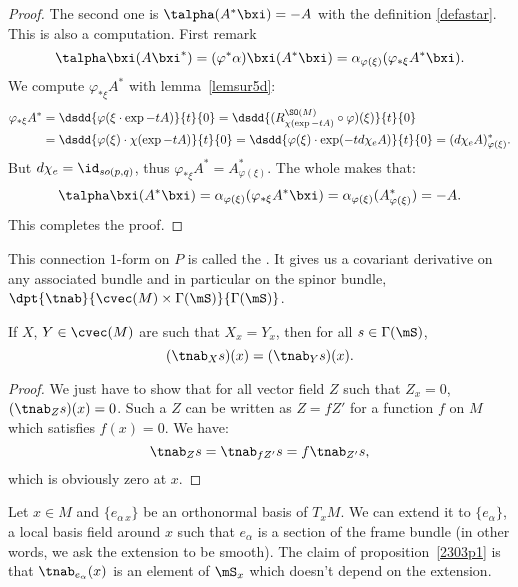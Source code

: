 \begin{proof}
	The second one is $\talpha(A^*\bxi)=-A$ with the definition \eqref{defastar}. This is also a computation. First remark
	\[
		\talpha\bxi(A\bxi^*)=(\varphi^*\alpha)\bxi(A^*\bxi)=\alpha_{\varphi(\xi)}(\varphi_{*\xi}A^*\bxi).
	\]
	We compute $\varphi_{*\xi}A^*$ with lemma~\ref{lemsur5d}:
	\begin{equation}
		\begin{split}
			\varphi_{*\xi}A^*&=\dsdd{\varphi(\xi\cdot\exp -tA)}{t}{0} =\dsdd{(R_{\chi(\exp -tA)}^{\SO(M)}\circ\varphi)(\xi)}{t}{0}\\
			&=\dsdd{\varphi(\xi)\cdot\chi(\exp -tA)}{t}{0}=\dsdd{\varphi(\xi)\cdot\exp(-td\chi_eA)}{t}{0}=(d\chi_eA)^*_{\varphi(\xi)}.
		\end{split}
	\end{equation}
	But $d\chi_e=\id_{so(p,q)}$, thus $\varphi_{*\xi}A^*=A^*_{\varphi(\xi)}$. The whole makes that:
	\[
		\talpha\bxi(A^*\bxi)=\alpha_{\varphi(\xi)}(\varphi_{*\xi}A^*\bxi)=\alpha_{\varphi(\xi)}(A^*_{\varphi(\xi)})=-A.
	\]
	This completes the proof.
\end{proof}

\begin{definition}
	This connection $1$-form on $P$ is called the . It gives us a covariant derivative on any associated bundle and in particular on the spinor bundle, $\dpt{\tnab}{\cvec(M)\times\Gamma(\mS)}{\Gamma(\mS)}$.
	\label{spinconn}
\end{definition}

\begin{proposition}
	If $X$, $Y\in\cvec(M)$ are such that $X_x=Y_x$, then for all $s\in\Gamma(\mS)$,
	\[
		(\tnab_Xs)(x)=(\tnab_Ys)(x).
	\]
	\label{2303p1}
\end{proposition}
\begin{proof}
	We just have to show that for all vector field $Z$ such that $Z_x=0$, $(\tnab_Zs)(x)=0$. Such a $Z$ can be written as $Z=fZ'$ for a function $f$ on $M$ which satisfies $f(x)=0$. We have:
	\[
		\tnab_Zs=\tnab_{fZ'}s=f\tnab_{Z'}s,
	\]
	which is obviously zero at $x$.
\end{proof}

Let $x\in M$ and $\{e_{\alpha\,x}\}$ be an orthonormal basis of $T_xM$. We can extend it to $\{e_{\alpha}\}$, a local basis field around $x$ such that $e_{\alpha}$ is a section of the frame bundle (in other words, we ask the extension to be smooth). The claim of proposition~\ref{2303p1} is that $\tnab_{e_{\alpha}}(x)$ is an element of $\mS_x$ which doesn't depend on the extension.

